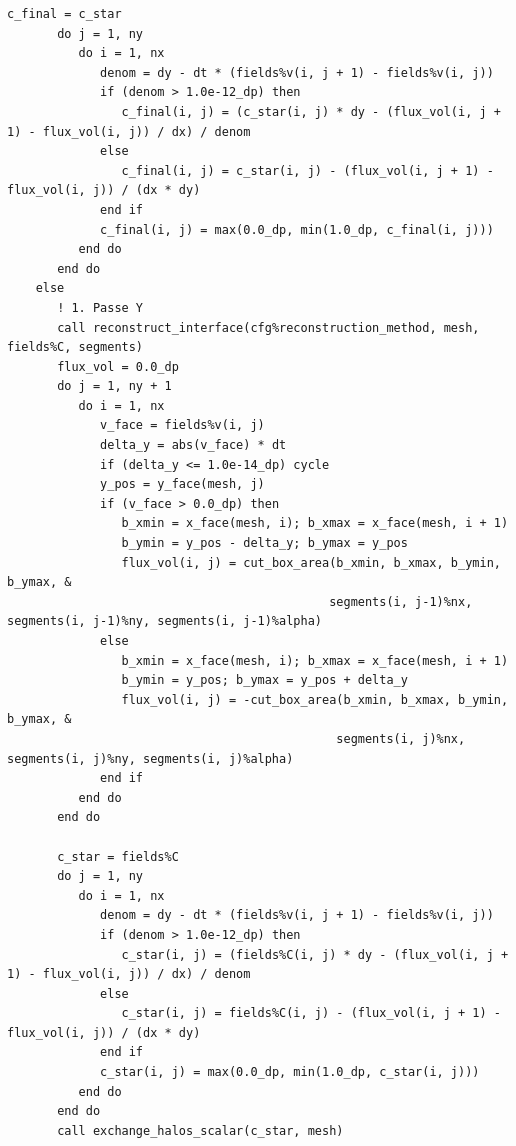 \documentclass[10pt,a4paper,oneside]{book}
\begin{document}
\begin{lstlisting}[language={[95]Fortran}]
       c_final = c_star
       do j = 1, ny
          do i = 1, nx
             denom = dy - dt * (fields%v(i, j + 1) - fields%v(i, j))
             if (denom > 1.0e-12_dp) then
                c_final(i, j) = (c_star(i, j) * dy - (flux_vol(i, j + 1) - flux_vol(i, j)) / dx) / denom
             else
                c_final(i, j) = c_star(i, j) - (flux_vol(i, j + 1) - flux_vol(i, j)) / (dx * dy)
             end if
             c_final(i, j) = max(0.0_dp, min(1.0_dp, c_final(i, j)))
          end do
       end do
    else
       ! 1. Passe Y
       call reconstruct_interface(cfg%reconstruction_method, mesh, fields%C, segments)
       flux_vol = 0.0_dp
       do j = 1, ny + 1
          do i = 1, nx
             v_face = fields%v(i, j)
             delta_y = abs(v_face) * dt
             if (delta_y <= 1.0e-14_dp) cycle
             y_pos = y_face(mesh, j)
             if (v_face > 0.0_dp) then
                b_xmin = x_face(mesh, i); b_xmax = x_face(mesh, i + 1)
                b_ymin = y_pos - delta_y; b_ymax = y_pos
                flux_vol(i, j) = cut_box_area(b_xmin, b_xmax, b_ymin, b_ymax, &
                                             segments(i, j-1)%nx, segments(i, j-1)%ny, segments(i, j-1)%alpha)
             else
                b_xmin = x_face(mesh, i); b_xmax = x_face(mesh, i + 1)
                b_ymin = y_pos; b_ymax = y_pos + delta_y
                flux_vol(i, j) = -cut_box_area(b_xmin, b_xmax, b_ymin, b_ymax, &
                                              segments(i, j)%nx, segments(i, j)%ny, segments(i, j)%alpha)
             end if
          end do
       end do

       c_star = fields%C
       do j = 1, ny
          do i = 1, nx
             denom = dy - dt * (fields%v(i, j + 1) - fields%v(i, j))
             if (denom > 1.0e-12_dp) then
                c_star(i, j) = (fields%C(i, j) * dy - (flux_vol(i, j + 1) - flux_vol(i, j)) / dx) / denom
             else
                c_star(i, j) = fields%C(i, j) - (flux_vol(i, j + 1) - flux_vol(i, j)) / (dx * dy)
             end if
             c_star(i, j) = max(0.0_dp, min(1.0_dp, c_star(i, j)))
          end do
       end do
       call exchange_halos_scalar(c_star, mesh)


\end{lstlisting}
\end{document}
